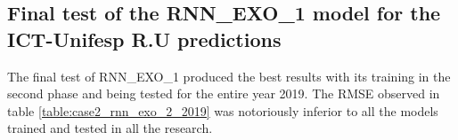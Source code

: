            
                  \begin{figure}[H]
                    \end{figure} 

   

            
            
      
           
           
            \begin{figure}[H]
            \end{figure}
           
           
           
                
                
                
    \subsection{Final test of the  RNN\_EXO\_1 model for the ICT-Unifesp R.U predictions}
    
     The final test of RNN\_EXO\_1 produced the best results with its training in the second phase and being tested for the entire year 2019. The RMSE observed in table  \ref{table:case2_rnn_exo_2_2019} was notoriously inferior to all the models trained and tested in all the research.
     
